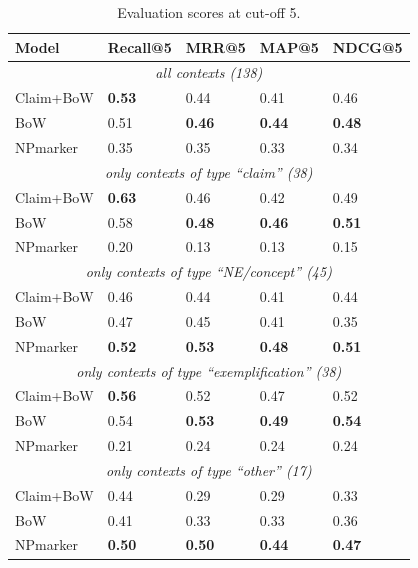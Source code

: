 \begin{table}[p!]
\centering
    \caption{Evaluation scores at cut-off 5.}
    \label{tab:userevalnumbers}
\begin{center}
    \begin{tabular}{lllll}
    \toprule
    Model & Recall@5 & MRR@5 & MAP@5 & NDCG@5 \\
    \midrule
    \multicolumn{5}{c}{\emph{all contexts (138)}} \\
    \midrule
    Claim+BoW & \textbf{0.53} & 0.44 & 0.41 & 0.46 \\
    BoW       & 0.51 & \textbf{0.46} & \textbf{0.44} & \textbf{0.48} \\
    NPmarker  & 0.35 & 0.35 & 0.33 & 0.34 \\
    \midrule
    \multicolumn{5}{c}{\emph{only contexts of type ``claim'' (38)}} \\
    \midrule
    Claim+BoW & \textbf{0.63} & 0.46 & 0.42 & 0.49 \\
    BoW       & 0.58 & \textbf{0.48} & \textbf{0.46} & \textbf{0.51} \\
    NPmarker  & 0.20 & 0.13 & 0.13 & 0.15 \\
    \midrule
    \multicolumn{5}{c}{\emph{only contexts of type ``NE/concept'' (45)}} \\
    \midrule
    Claim+BoW & 0.46 & 0.44 & 0.41 & 0.44 \\
    BoW       & 0.47 & 0.45 & 0.41 & 0.35 \\
    NPmarker  & \textbf{0.52} & \textbf{0.53} & \textbf{0.48} & \textbf{0.51} \\
    \midrule
    \multicolumn{5}{c}{\emph{only contexts of type ``exemplification'' (38)}} \\
    \midrule
    Claim+BoW & \textbf{0.56} & 0.52 & 0.47 & 0.52 \\
    BoW       & 0.54 & \textbf{0.53} & \textbf{0.49} & \textbf{0.54} \\
    NPmarker  & 0.21 & 0.24 & 0.24 & 0.24 \\
    \midrule
    \multicolumn{5}{c}{\emph{only contexts of type ``other'' (17)}} \\
    \midrule
    Claim+BoW & 0.44 & 0.29 & 0.29 & 0.33 \\
    BoW       & 0.41 & 0.33 & 0.33 & 0.36 \\
    NPmarker  & \textbf{0.50} & \textbf{0.50} & \textbf{0.44} & \textbf{0.47} \\
    \bottomrule
    \end{tabular}
\end{center}
\end{table}


